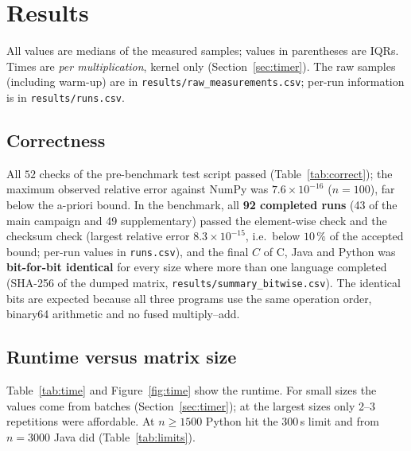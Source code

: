 \section{Results}

All values are medians of the measured samples; values in parentheses are IQRs. Times are \emph{per
multiplication}, kernel only (Section~\ref{sec:timer}). The raw samples (including warm-up) are in
\texttt{results/raw\_measurements.csv}; per-run information is in \texttt{results/runs.csv}.

\subsection{Correctness}
All $52$ checks of the pre-benchmark test script passed (Table~\ref{tab:correct}); the maximum observed relative
error against NumPy was $7.6\times10^{-16}$ ($n=100$), far below the a-priori bound. In the benchmark, all
\textbf{92 completed runs} (43 of the main campaign and 49 supplementary) passed the element-wise check and the checksum
check (largest relative error $8.3\times10^{-15}$, i.e.\ below $10\,\%$ of the accepted bound; per-run values in
\texttt{runs.csv}), and the final $C$ of C, Java and Python was \textbf{bit-for-bit identical} for every size where
more than one language completed (SHA-256 of the dumped matrix, \texttt{results/summary\_bitwise.csv}). The
identical bits are expected because all three programs use the same operation order, binary64 arithmetic and no
fused multiply--add.

\begin{table}[H]
\centering\footnotesize

\caption{Pre-benchmark correctness tests (each run in C, Java and Python; bit-for-bit identical across languages in every test).}
\label{tab:correct}
\end{table}

\subsection{Runtime versus matrix size}
Table~\ref{tab:time} and Figure~\ref{fig:time} show the runtime. For small sizes the values come from batches
(Section~\ref{sec:timer}); at the largest sizes only 2--3 repetitions were affordable. At $n\ge 1500$ Python hit
the 300\,s limit and from $n=3000$ Java did (Table~\ref{tab:limits}).

\begin{table}[H]
\centering\footnotesize
\setlength{\tabcolsep}{4pt}

\caption{Median (IQR) time of one multiplication, and number of measured repetitions per implementation. Italics: no
time exists for that configuration (timeout at the $300$\,s per-sample limit, or not attempted because an earlier size already failed).}
\label{tab:time}
\end{table}


